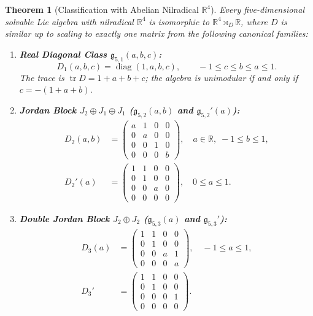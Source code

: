 \documentclass[11pt,a4paper]{article}
\newtheorem{theorem}{Theorem}[section]
\theoremstyle{definition}
\theoremstyle{remark}
\newcommand{\R}{\mathbb{R}}
\newcommand{\g}{\mathfrak{g}}
\newcommand{\tr}{\operatorname{tr}}
\newcommand{\diag}{\operatorname{diag}}
\begin{document}
\begin{theorem}[Classification with Abelian Nilradical $\R^4$]\label{thm:R4_classes}
Every five-dimensional solvable Lie algebra with nilradical $\R^4$ is isomorphic to $\R^4 \rtimes_D \R$, where $D$ is similar up to scaling to exactly one matrix from the following canonical families:
\begin{enumerate}
    \item \textbf{Real Diagonal Class $\g_{5,1}(a, b, c)$:}
    \begin{equation}
        D_1(a, b, c) = \diag(1, a, b, c), \qquad -1 \le c \le b \le a \le 1.
    \end{equation}
    The trace is $\tr D = 1 + a + b + c$; the algebra is unimodular if and only if $c = -(1 + a + b)$.
    
    \item \textbf{Jordan Block $J_2 \oplus J_1 \oplus J_1$ ($\g_{5,2}(a, b)$ and $\g_{5,2}'(a)$):}
    \begin{align}
        D_2(a, b) &= \begin{pmatrix} a & 1 & 0 & 0 \\ 0 & a & 0 & 0 \\ 0 & 0 & 1 & 0 \\ 0 & 0 & 0 & b \end{pmatrix}, \quad a \in \R, \; -1 \le b \le 1, \\
        D_2'(a) &= \begin{pmatrix} 1 & 1 & 0 & 0 \\ 0 & 1 & 0 & 0 \\ 0 & 0 & a & 0 \\ 0 & 0 & 0 & 0 \end{pmatrix}, \quad 0 \le a \le 1.
    \end{align}
    
    \item \textbf{Double Jordan Block $J_2 \oplus J_2$ ($\g_{5,3}(a)$ and $\g_{5,3}'$):}
    \begin{align}
        D_3(a) &= \begin{pmatrix} 1 & 1 & 0 & 0 \\ 0 & 1 & 0 & 0 \\ 0 & 0 & a & 1 \\ 0 & 0 & 0 & a \end{pmatrix}, \quad -1 \le a \le 1, \\
        D_3' &= \begin{pmatrix} 1 & 1 & 0 & 0 \\ 0 & 1 & 0 & 0 \\ 0 & 0 & 0 & 1 \\ 0 & 0 & 0 & 0 \end{pmatrix}.
    \end{align}
    

\end{enumerate}
\end{theorem}
\end{document}
